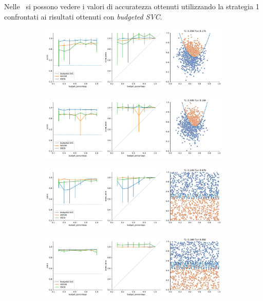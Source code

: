 Nelle~ si possono vedere i valori di accuratezza ottenuti utilizzando la strategia 1 confrontati ai risultati ottenuti con \emph{budgeted SVC}.
\begin{figure}
    \begin{subfigure}{.5\textwidth}
        \centering
        \includegraphics[width=\textwidth]{img/comp_old/3.pdf}
    \end{subfigure}%
    \begin{subfigure}{.5\textwidth}
        \centering
        \includegraphics[width=\textwidth]{img/comp_old/4.pdf}
    \end{subfigure}
    \hfill
    \begin{subfigure}{.5\textwidth}
        \centering
        \includegraphics[width=\textwidth]{img/comp_old/8.pdf}
    \end{subfigure}
    \begin{subfigure}{.5\textwidth}
        \centering
        \includegraphics[width=\textwidth]{img/comp_old/9.pdf}

\end{subfigure}
\end{figure}
